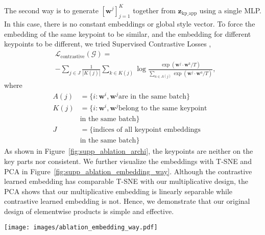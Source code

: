 \documentclass[10pt, conference, compsocconf]{IEEEtran}
\newcommand{\vw}{\mathbf{w}}
\newcommand{\vz}{\mathbf{z}}
\begin{document}
\label{supp:contrastive_learning}
The second way is to generate $[\vw^j]_{j=1}^K$ together from $\vz_\text{kp\_app}$ using a single MLP. In this case, there is no constant embeddings or global style vector. To force the embedding of the same keypoint to be similar, and the embedding for different keypoints to be different, we tried Supervised Contrastive Losses \cite{khosla2020supervised},
\begin{equation}
\begin{aligned}
    &\mathcal L_\text{contrastive}(\mathcal G) = \\
    &-\sum_{j\in J}\frac{1}{|K(j)|}\sum_{k\in K(j)}\log\frac{\exp(\vw^j \cdot \vw^k / T)}{\sum_{a\in A(j)} \exp(\vw^j \cdot \vw^a / T)},
\end{aligned}
    \label{eq:noise combination contrastive}
\end{equation}
where 
$$
\begin{aligned}
    A(j)&=\{i: \vw^i, \vw^j \text{are in the same batch}\}&\\
    K(j)&=\{i: \vw^i, \vw^j \text{belong to the same keypoint}&\\
    &                                \text{in the same batch}\}&\\
    J&=\{\text{indices of all } \text{keypoint embeddings}&\\
    &\text{in the same batch}\}&
\end{aligned}
$$
As shown in Figure~\ref{fig:supp_ablation_archi}, the keypoints are neither on the key parts nor consistent. We further visualize the embeddings with T-SNE and PCA in Figure~\ref{fig:supp_ablation_embedding_way}. Although the contrastive learned embedding has comparable T-SNE with our multiplicative design, the PCA shows that our multiplicative embedding is linearly separable while contrastive learned embedding is not. Hence, we demonstrate that our original design of elementwise products is simple and effective.

\begin{figure*}[t]
\begin{center}
   \texttt{[image: images/ablation\_embedding\_way.pdf]}
\end{center}
   \caption{\textbf{Ablation study on multiplicative embedding}. We show the T-SNE and PCA visualization of embeddings learned on FFHQ. The first two column shows keypoint embeddings and the last two column shows keypoint embeddings and background embedding.}
\label{fig:supp_ablation_embedding_way}
\end{figure*}
\end{document}
